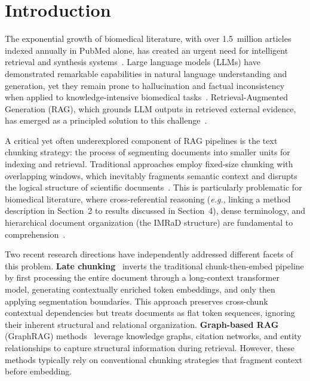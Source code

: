 \documentclass[sn-basic]{sn-jnl}
\newcommand{\eg}{\textit{e.g.}}
\begin{document}

\maketitle

\section{Introduction}\label{sec:introduction}

The exponential growth of biomedical literature, with over 1.5~million articles indexed annually in PubMed alone, has created an urgent need for intelligent retrieval and synthesis systems~\cite{canese2013pubmed}. Large language models (LLMs) have demonstrated remarkable capabilities in natural language understanding and generation, yet they remain prone to hallucination and factual inconsistency when applied to knowledge-intensive biomedical tasks~\cite{ji2023survey,huang2025survey}. Retrieval-Augmented Generation (RAG), which grounds LLM outputs in retrieved external evidence, has emerged as a principled solution to this challenge~\cite{lewis2020retrieval,gao2024retrieval}.

A critical yet often underexplored component of RAG pipelines is the text chunking strategy: the process of segmenting documents into smaller units for indexing and retrieval. Traditional approaches employ fixed-size chunking with overlapping windows, which inevitably fragments semantic context and disrupts the logical structure of scientific documents~\cite{merola2025reconstructing}. This is particularly problematic for biomedical literature, where cross-referential reasoning (\eg, linking a method description in Section~2 to results discussed in Section~4), dense terminology, and hierarchical document organization (the IMRaD structure) are fundamental to comprehension~\cite{sollaci2004imrad}.

Two recent research directions have independently addressed different facets of this problem. \textbf{Late chunking}~\cite{gunther2024late} inverts the traditional chunk-then-embed pipeline by first processing the entire document through a long-context transformer model, generating contextually enriched token embeddings, and only then applying segmentation boundaries. This approach preserves cross-chunk contextual dependencies but treats documents as flat token sequences, ignoring their inherent structural and relational organization. \textbf{Graph-based RAG} (GraphRAG) methods~\cite{edge2024local,peng2024graph,han2025graphrag} leverage knowledge graphs, citation networks, and entity relationships to capture structural information during retrieval. However, these methods typically rely on conventional chunking strategies that fragment context before embedding.
\end{document}

